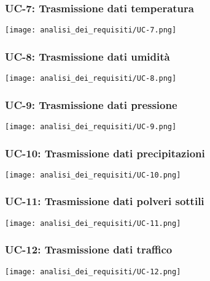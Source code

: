 \subsubsection{UC-7: Trasmissione dati temperatura}
\begin{center}
	\texttt{[image: analisi\_dei\_requisiti/UC-7.png]}
\end{center}

\subsubsection{UC-8: Trasmissione dati umidità}
\begin{center}
	\texttt{[image: analisi\_dei\_requisiti/UC-8.png]}
\end{center}

\subsubsection{UC-9: Trasmissione dati pressione}
\begin{center}
	\texttt{[image: analisi\_dei\_requisiti/UC-9.png]}
\end{center}

\subsubsection{UC-10: Trasmissione dati precipitazioni}
\begin{center}
	\texttt{[image: analisi\_dei\_requisiti/UC-10.png]}
\end{center}

\subsubsection{UC-11: Trasmissione dati polveri sottili}
\begin{center}
	\texttt{[image: analisi\_dei\_requisiti/UC-11.png]}
\end{center}

\subsubsection{UC-12: Trasmissione dati traffico}
\begin{center}
	\texttt{[image: analisi\_dei\_requisiti/UC-12.png]}
\end{center}

